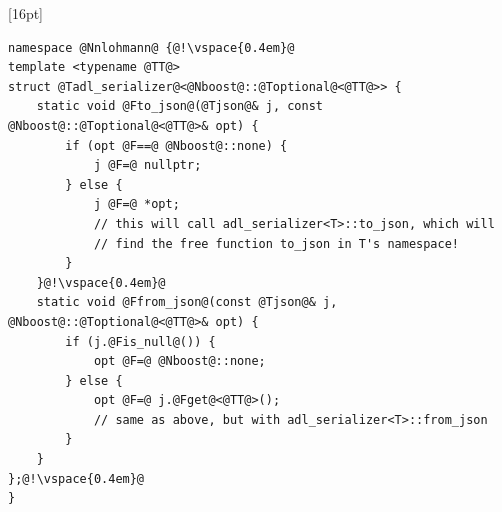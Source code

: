 \documentclass{slides}
\begin{document}
\begin{tcolorbox}{\F{12pt}[16pt]
\begin{lstlisting}
namespace @Nnlohmann@ {@!\vspace{0.4em}@
template <typename @TT@>
struct @Tadl_serializer@<@Nboost@::@Toptional@<@TT@>> {
    static void @Fto_json@(@Tjson@& j, const @Nboost@::@Toptional@<@TT@>& opt) {
        if (opt @F==@ @Nboost@::none) {
            j @F=@ nullptr;
        } else {
            j @F=@ *opt;
            // this will call adl_serializer<T>::to_json, which will
            // find the free function to_json in T's namespace!
        }
    }@!\vspace{0.4em}@
    static void @Ffrom_json@(const @Tjson@& j, @Nboost@::@Toptional@<@TT@>& opt) {
        if (j.@Fis_null@()) {
            opt @F=@ @Nboost@::none;
        } else {
            opt @F=@ j.@Fget@<@TT@>();
            // same as above, but with adl_serializer<T>::from_json
        }
    }
};@!\vspace{0.4em}@
}
\end{lstlisting}
}\end{tcolorbox}
\vspace{-1em}

\end{document}
